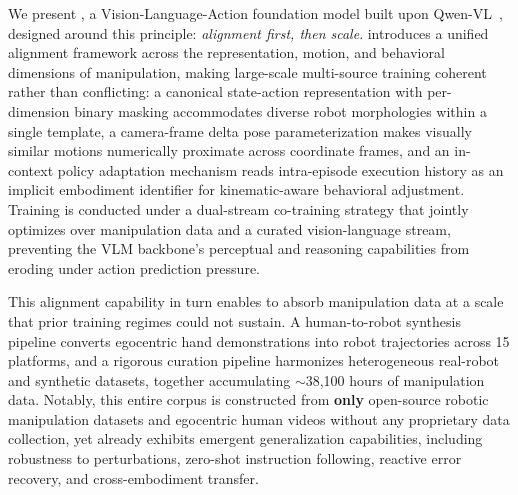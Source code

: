 We present \textbf{\ours}, a Vision-Language-Action foundation model built upon Qwen-VL~\citep{yang2025qwen3, qwen3-vl,qwen35blog}, designed around this principle: \emph{alignment first, then scale}. %
\ours introduces a unified alignment framework across the representation, motion, and behavioral dimensions of manipulation, making large-scale multi-source training coherent rather than conflicting: a canonical state-action representation with per-dimension binary masking accommodates diverse robot morphologies within a single template, a camera-frame delta pose parameterization makes visually similar motions numerically proximate across coordinate frames, and an in-context policy adaptation mechanism reads intra-episode execution history as an implicit embodiment identifier for kinematic-aware behavioral adjustment. 
Training is conducted under a dual-stream co-training strategy that jointly optimizes over manipulation data and a curated vision-language stream, preventing the VLM backbone's perceptual and reasoning capabilities from eroding under action prediction pressure.

This alignment capability in turn enables \ours to absorb manipulation data at a scale that prior training regimes could not sustain. 
A human-to-robot synthesis pipeline converts egocentric hand demonstrations into robot trajectories across 15 platforms, and a rigorous curation pipeline harmonizes heterogeneous real-robot and synthetic datasets, together accumulating $\sim$38,100 hours of manipulation data. 
Notably, this entire corpus is constructed from \textbf{only} open-source robotic manipulation datasets and egocentric human videos without any proprietary data collection, yet \ours already exhibits emergent generalization capabilities, including robustness to perturbations, zero-shot instruction following, reactive error recovery, and cross-embodiment transfer.

